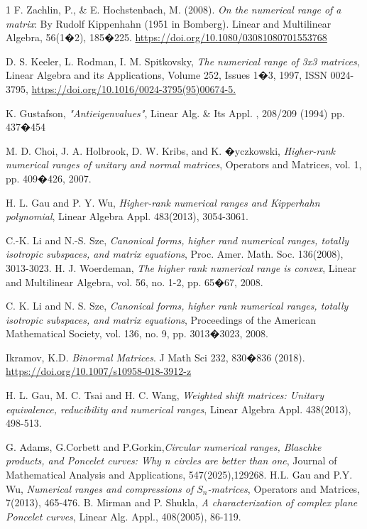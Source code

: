 \documentclass[10pt,a4paper,reqno]{amsart}
\begin{document}
\begin{thebibliography}{1}
 F. Zachlin, P., \& E. Hochstenbach, M. (2008). \textit{On the numerical range of a matrix}: By Rudolf Kippenhahn (1951 in Bomberg). Linear and Multilinear Algebra, 56(1�2), 185�225. \url{https://doi.org/10.1080/03081080701553768}

 D. S. Keeler, L. Rodman, I. M. Spitkovsky,
\textit{The numerical range of 3x3 matrices},
Linear Algebra and its Applications,
Volume 252, Issues 1�3,
1997,
ISSN 0024-3795,
\url{https://doi.org/10.1016/0024-3795(95)00674-5.}



 K. Gustafson, \textit{"Antieigenvalues"}, Linear Alg. \& Its Appl. , 208/209 (1994) pp. 437�454




 M. D. Choi, J. A. Holbrook, D. W. Kribs, and K. �yczkowski, \textit{Higher-rank numerical ranges of unitary and normal matrices}, Operators and Matrices, vol. 1, pp. 409�426, 2007.

H. L. Gau and P. Y. Wu, \textit{Higher-rank numerical ranges and Kipperhahn polynomial}, Linear Algebra Appl. 483(2013), 3054-3061.

 C.-K. Li and N.-S. Sze, \textit{Canonical forms, higher rand numerical ranges, totally isotropic subspaces, and matrix equations}, Proc. Amer. Math. Soc. 136(2008), 3013-3023.
H. J. Woerdeman, \textit{The higher rank numerical range is convex}, Linear and Multilinear Algebra, vol. 56, no. 1-2, pp. 65�67, 2008.

C. K. Li and N. S. Sze, \textit{Canonical forms, higher rank numerical ranges, totally isotropic subspaces, and matrix equations}, Proceedings of the American Mathematical Society, vol. 136, no. 9, pp. 3013�3023, 2008.


Ikramov, K.D. \textit{Binormal Matrices}. J Math Sci 232, 830�836 (2018). \url{https://doi.org/10.1007/s10958-018-3912-z}

 H. L. Gau, M. C. Tsai and H. C. Wang,\textit{ Weighted shift matrices:
Unitary equivalence, reducibility and numerical ranges}, Linear Algebra
Appl. 438(2013), 498-513.

G. Adams, G.Corbett and P.Gorkin,\textit{Circular numerical ranges,
Blaschke products, and Poncelet curves: Why n circles are better
than one}, Journal of Mathematical Analysis and Applications,
547(2025),129268.
H.L. Gau and P.Y. Wu,\textit{ Numerical ranges and compressions of $S_n$-matrices},
Operators and Matrices, 7(2013), 465-476.
B. Mirman and P. Shukla,\textit{ A characterization of complex plane Poncelet
curves}, Linear Alg. Appl., 408(2005), 86-119.


\end{thebibliography}
\end{document}
